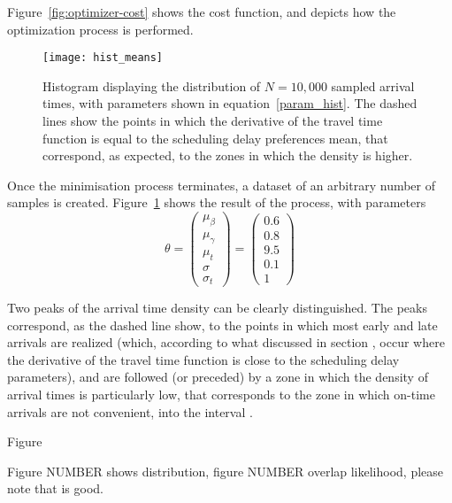 Figure~\ref{fig:optimizer-cost} shows the cost function,
and depicts how the optimization process is performed.

\begin{figure}
  \centering
  \texttt{[image: hist\_means]}
  \caption{
    Histogram displaying the distribution of \(N=10,000\) sampled arrival times,
    with parameters shown in equation~\eqref{param_hist}.
    The dashed lines show the points in which the derivative of the travel time function is equal to the scheduling delay preferences mean,
    that correspond, as expected,
    to the zones in which the density is higher.
  }
  \label{fig:hist-means}
\end{figure}

Once the minimisation process terminates,
a dataset of an arbitrary number of samples is created.
Figure~\ref{fig:hist-means} shows the result of the process,
with parameters
\begin{equation}
  \label{param_hist}
  \theta =
  \begin{pmatrix}
    \mu_\beta \\
    \mu_\gamma \\
    \mu_t \\
    \sigma \\
    \sigma_t
  \end{pmatrix}
  =
  \begin{pmatrix}
    0.6 \\
    0.8 \\
    9.5 \\
    0.1 \\
    1
  \end{pmatrix}
\end{equation}

Two peaks of the arrival time density can be clearly distinguished.
The peaks correspond, as the dashed line show, to the points in which most early and late arrivals are realized
(which, according to what discussed in section ,
occur where the derivative of the travel time function is close to the scheduling delay parameters),
and are followed (or preceded) by a zone in which the density of arrival times is particularly low,
that corresponds to the zone in which on-time arrivals are not convenient,
into the interval .



Figure

Figure NUMBER shows distribution,
figure NUMBER overlap likelihood,
please note that is good.

